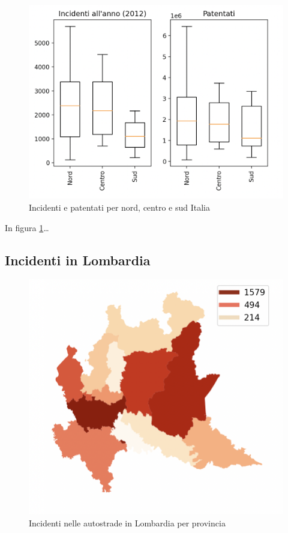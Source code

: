 \documentclass[a4paper]{report}
\begin{document}
\begin{figure}
    \includegraphics[width=\linewidth]{../src/incidenti/incidenti_aci/mappe_regioni/incidenti_patenti_box.png}
    \caption{Incidenti e patentati per nord, centro e sud Italia}
    \label{fig:incidenti-patentati-box}
\end{figure}

In figura \ref{fig:incidenti-patentati-box}\dots



\subsection{Incidenti in Lombardia}

\begin{figure}
    \includegraphics[width=\linewidth]{../src/provincia/lombardia_autostrade.png}
    \caption{Incidenti nelle autostrade in Lombardia per provincia}
    \label{fig:lombardia-autostrade}
\end{figure}
\end{document}
